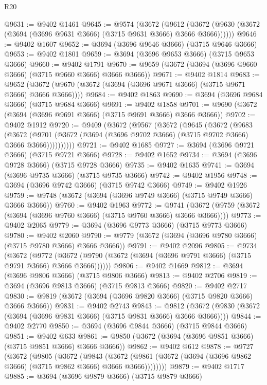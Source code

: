 \begin{lexlean}{R20}
\begin{coremodule}
@9631 := @9402 @1461
@9645 := @9574
    (@3672
      (@9612 (@3672 (@9630 (@3672 (@3694 (@3696 @9631 @3666) (@3715 @9631 @3666) @3666 @3666))))))
@9646 := @9402 @1607
@9652 := @3694 (@3696 @9646 @3666) (@3715 @9646 @3666)
@9653 := @9402 @1801
@9659 := @3694 (@3696 @9653 @3666) (@3715 @9653 @3666)
@9660 := @9402 @1791
@9670 := @9659 (@3672 (@3694 (@3696 @9660 @3666) (@3715 @9660 @3666) @3666 @3666))
@9671 := @9402 @1814
@9683 := @9652 (@3672 (@9670 (@3672 (@3694 (@3696 @9671 @3666) (@3715 @9671 @3666) @3666 @3666))))
@9684 := @9402 @1863
@9690 := @3694 (@3696 @9684 @3666) (@3715 @9684 @3666)
@9691 := @9402 @1858
@9701 := @9690 (@3672 (@3694 (@3696 @9691 @3666) (@3715 @9691 @3666) @3666 @3666))
@9702 := @9402 @1912
@9720 := @9409
    (@3672
      (@9567
        (@3672
          (@9645
            (@3672
              (@9683
                (@3672
                  (@9701 (@3672 (@3694 (@3696 @9702 @3666) (@3715 @9702 @3666) @3666 @3666))))))))))
@9721 := @9402 @1685
@9727 := @3694 (@3696 @9721 @3666) (@3715 @9721 @3666)
@9728 := @9402 @1652
@9734 := @3694 (@3696 @9728 @3666) (@3715 @9728 @3666)
@9735 := @9402 @1635
@9741 := @3694 (@3696 @9735 @3666) (@3715 @9735 @3666)
@9742 := @9402 @1956
@9748 := @3694 (@3696 @9742 @3666) (@3715 @9742 @3666)
@9749 := @9402 @1926
@9759 := @9748 (@3672 (@3694 (@3696 @9749 @3666) (@3715 @9749 @3666) @3666 @3666))
@9760 := @9402 @1963
@9772 := @9741 (@3672 (@9759 (@3672 (@3694 (@3696 @9760 @3666) (@3715 @9760 @3666) @3666 @3666))))
@9773 := @9402 @2065
@9779 := @3694 (@3696 @9773 @3666) (@3715 @9773 @3666)
@9780 := @9402 @2060
@9790 := @9779 (@3672 (@3694 (@3696 @9780 @3666) (@3715 @9780 @3666) @3666 @3666))
@9791 := @9402 @2096
@9805 := @9734
    (@3672
      (@9772 (@3672 (@9790 (@3672 (@3694 (@3696 @9791 @3666) (@3715 @9791 @3666) @3666 @3666))))))
@9806 := @9402 @1669
@9812 := @3694 (@3696 @9806 @3666) (@3715 @9806 @3666)
@9813 := @9402 @2706
@9819 := @3694 (@3696 @9813 @3666) (@3715 @9813 @3666)
@9820 := @9402 @2717
@9830 := @9819 (@3672 (@3694 (@3696 @9820 @3666) (@3715 @9820 @3666) @3666 @3666))
@9831 := @9402 @2743
@9843 := @9812 (@3672 (@9830 (@3672 (@3694 (@3696 @9831 @3666) (@3715 @9831 @3666) @3666 @3666))))
@9844 := @9402 @2770
@9850 := @3694 (@3696 @9844 @3666) (@3715 @9844 @3666)
@9851 := @9402 @633
@9861 := @9850 (@3672 (@3694 (@3696 @9851 @3666) (@3715 @9851 @3666) @3666 @3666))
@9862 := @9402 @612
@9878 := @9727
    (@3672
      (@9805
        (@3672
          (@9843
            (@3672 (@9861 (@3672 (@3694 (@3696 @9862 @3666) (@3715 @9862 @3666) @3666 @3666))))))))
@9879 := @9402 @1717
@9885 := @3694 (@3696 @9879 @3666) (@3715 @9879 @3666)

\end{coremodule}
\end{lexlean}
